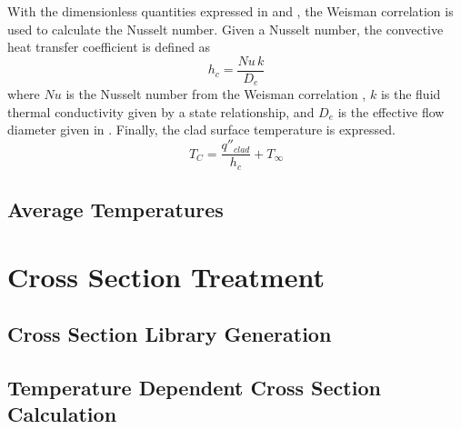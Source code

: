       With the dimensionless quantities expressed in  and
      , the Weisman correlation is used to calculate the Nusselt
      number. Given a Nusselt number, the convective heat transfer coefficient
      is defined as
      \begin{equation}
        \label{eq:hc}
        h_c = \frac{Nu \, k}{D_e}
      \end{equation}
      where $Nu$ is the Nusselt number from the Weisman correlation
      , $k$ is the fluid thermal conductivity given by a state
      relationship, and $D_e$ is the effective flow diameter given in
      . Finally, the clad surface temperature is expressed.
      \begin{equation}
        \label{eq:tc}
        T_C = \frac{q''_{clad}}{h_c} + T_{\infty}
      \end{equation}

  \subsection{Average Temperatures}
\section{Cross Section Treatment}
  \subsection{Cross Section Library Generation}
  \subsection{Temperature Dependent Cross Section Calculation}

